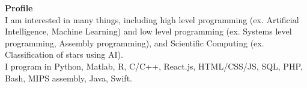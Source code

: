 \textbf{\large Profile\normalsize} 
\\
I am interested in many things, including high level programming (ex.
Artificial Intelligence, Machine Learning) and low level programming (ex.
Systems level programming, Assembly programming), and Scientific Computing (ex.
Classification of stars using AI).
\\
I program in Python, Matlab, R, C/C++, React.js, HTML/CSS/JS, SQL, PHP, Bash, MIPS assembly, Java,  Swift.
